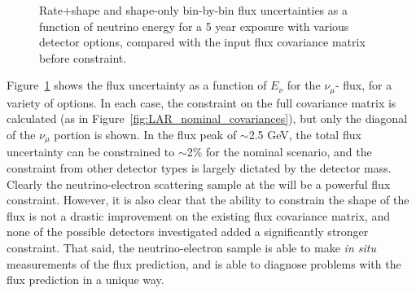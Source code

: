 \begin{figure}[htbp]
  \centering
  \caption{Rate+shape and shape-only bin-by-bin flux uncertainties as a function of neutrino energy for a 5 year exposure with various detector options, compared with the input flux covariance matrix before constraint.}
  \label{fig:nominal_det_constraint}
\end{figure}
Figure~\ref{fig:nominal_det_constraint} shows the flux uncertainty as a function of $E_{\nu}$ for the $\nu_{\mu}$- flux, for a variety of  options. In each case, the constraint on the full covariance matrix is calculated (as in Figure~\ref{fig:LAR_nominal_covariances}), but only the diagonal of the $\nu_{\mu}$ portion is shown. In the flux peak of $\sim$2.5 GeV, the total flux uncertainty can be constrained to $\sim$2\% for the nominal  scenario, and the constraint from other detector types is largely dictated by the detector mass. Clearly the neutrino-electron scattering sample at the   will be a powerful flux constraint. However, it is also clear that the ability to constrain the shape of the flux is not a drastic improvement on the existing flux covariance matrix, and none of the possible detectors investigated added a significantly stronger constraint. That said, the neutrino-electron sample is able to make \textit{in situ} measurements of the flux prediction, and is able to diagnose problems with the flux prediction in a unique way.


